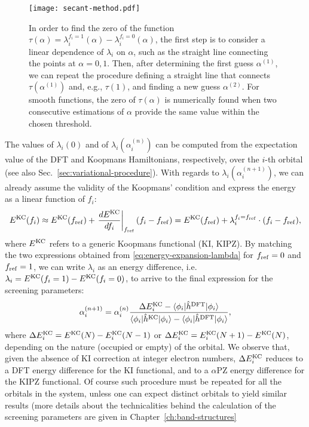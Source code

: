 \begin{figure}
    \centering
    \texttt{[image: secant-method.pdf]}
    \caption[Secant method to determine the screening parameters]{In order to find the zero of the function $\tau(\alpha) = \lambda_i^{f_i=1}(\alpha) - \lambda_i^{f_i=0}(\alpha)$, the first step is to consider a linear dependence of $\lambda_i$ on $\alpha$, such as the straight line connecting the points at $\alpha=0,1$. Then, after determining the first guess $\alpha^{(1)}$, we can repeat the procedure defining a straight line that connects $\tau(\alpha^{(1)})$ and, e.g., $\tau(1)$, and finding a new guess $\alpha^{(2)}$. For smooth functions, the zero of $\tau(\alpha)$ is numerically found when two consecutive estimations of $\alpha$ provide the same value within the chosen threshold.}
    \label{fig:secant-method}
\end{figure}

The values of $\lambda_i(0)$ and of $\lambda_i(\alpha_i^{(n)})$ can be computed from the expectation value of the DFT and Koopmans Hamiltonians, respectively, over the $i$-th orbital (see also Sec.~\ref{sec:variational-procedure}). With regards to $\lambda_i(\alpha_i^{(n+1)})$, we can already assume the validity of the Koopmans' condition and express the energy as a linear function of $f_i$:
%
\begin{equation}
    E^{\rm KC}(f_i) \approx E^{\rm KC}(f_{\rm ref}) + \left. \frac{dE^{\rm KC}}{df_i} \right|_{f_{\rm ref}} (f_i-f_{\rm ref}) =
    E^{\rm KC}(f_{\rm ref}) + \lambda_i^{f_i=f_{\rm ref}} \cdot (f_i-f_{\rm ref}) ,
    \label{eq:energy-expansion-lambda}
\end{equation}
%
where $E^{\rm KC}$ refers to a generic Koopmans functional (KI, KIPZ). By matching the two expressions obtained from \cref{eq:energy-expansion-lambda} for $f_{\rm ref} = 0$ and $f_{\rm ref} = 1$, we can write $\lambda_i$ as an energy difference, i.e. $\lambda_i = E^{\rm KC}(f_i=1) - E^{\rm KC}(f_i=0)$, to arrive to the final expression for the screening parameters:
%
\begin{equation}
    \alpha_i^{(n+1)} = \alpha_i^{(n)} \frac{\Delta E^{\rm KC}_i - \braket{\phi_i|\hat{h}^{\rm DFT}|\phi_i}}{\braket{\phi_i|\hat{h}^{\rm KC}|\phi_i} - \braket{\phi_i|\hat{h}^{\rm DFT}|\phi_i}} ,
    \label{eq:screening-parameter-iterative}
\end{equation}
%
where $\Delta E^{\rm KC}_i = E^{\rm KC}(N) - E^{\rm KC}_i(N-1)$ or $\Delta E^{\rm KC}_i = E^{\rm KC}_i(N+1) - E^{\rm KC}(N)$, depending on the nature (occupied or empty) of the orbital. We observe that, given the absence of KI correction at integer electron numbers, $\Delta E^{\rm KC}_i$ reduces to a DFT energy difference for the KI functional, and to a $\alpha$PZ energy difference for the KIPZ functional. Of course such procedure must be repeated for all the orbitals in the system, unless one can expect distinct orbitals to yield similar results (more details about the technicalities behind the calculation of the screening parameters are given in Chapter~\ref{ch:band-structures}

